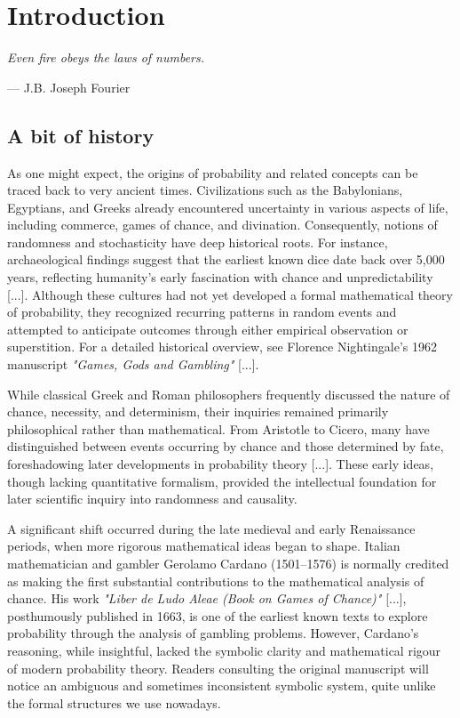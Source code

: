 \chapter{Introduction}
\label{introduction}

\epigraph{\textit{Even fire obeys the laws of numbers.}}{— J.B. Joseph Fourier}

\section*{A bit of history}

As one might expect, the origins of probability and related concepts can be traced back to very ancient times. Civilizations such as the Babylonians, Egyptians, and Greeks already encountered uncertainty in various aspects of life, including commerce, games of chance, and divination. Consequently, notions of randomness and stochasticity have deep historical roots. For instance, archaeological findings suggest that the earliest known dice date back over 5,000 years, reflecting humanity’s early fascination with chance and unpredictability [...]. Although these cultures had not yet developed a formal mathematical theory of probability, they recognized recurring patterns in random events and attempted to anticipate outcomes through either empirical observation or superstition. For a detailed historical overview, see Florence Nightingale's 1962 manuscript \textit{"Games, Gods and Gambling"} [...].

\medskip

While classical Greek and Roman philosophers frequently discussed the nature of chance, necessity, and determinism, their inquiries remained primarily philosophical rather than mathematical. From Aristotle to Cicero, many have distinguished between events occurring by chance and those determined by fate, foreshadowing later developments in probability theory [...]. These early ideas, though lacking quantitative formalism, provided the intellectual foundation for later scientific inquiry into randomness and causality.

A significant shift occurred during the late medieval and early Renaissance periods, when more rigorous mathematical ideas began to shape. Italian mathematician and gambler Gerolamo Cardano (1501–1576) is normally credited as making the first substantial contributions to the mathematical analysis of chance. His work \textit{"Liber de Ludo Aleae (Book on Games of Chance)"} [...], posthumously published in 1663, is one of the earliest known texts to explore probability through the analysis of gambling problems. However, Cardano’s reasoning, while insightful, lacked the symbolic clarity and mathematical rigour of modern probability theory. Readers consulting the original manuscript will notice an ambiguous and sometimes inconsistent symbolic system, quite unlike the formal structures we use nowadays.


